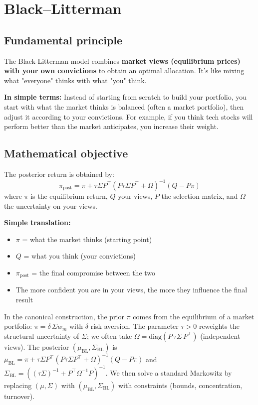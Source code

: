 \documentclass[11pt,a4paper]{article}
\begin{document}
\FloatBarrier
\section{Black--Litterman}

\subsection{Fundamental principle}
The Black-Litterman model combines \textbf{market views (equilibrium prices) with your own convictions} to obtain an optimal allocation. It's like mixing what "everyone" thinks with what "you" think.

\textbf{In simple terms:} Instead of starting from scratch to build your portfolio, you start with what the market thinks is balanced (often a market portfolio), then adjust it according to your convictions. For example, if you think tech stocks will perform better than the market anticipates, you increase their weight.

\subsection{Mathematical objective}
The posterior return is obtained by:
\[\pi_{\text{post}} = \pi + \tau \Sigma P^\top (P \tau \Sigma P^\top + \Omega)^{-1} (Q - P \pi)\]
where \(\pi\) is the equilibrium return, \(Q\) your views, \(P\) the selection matrix, and \(\Omega\) the uncertainty on your views.

\textbf{Simple translation:} 
\begin{itemize}
\item \(\pi\) = what the market thinks (starting point)
\item \(Q\) = what you think (your convictions)
\item \(\pi_{\text{post}}\) = the final compromise between the two
\item The more confident you are in your views, the more they influence the final result
\end{itemize}
\noindent In the canonical construction, the prior \(\pi\) comes from the equilibrium of a market portfolio: \(\pi = \delta \, \Sigma w_m\) with \(\delta\) risk aversion. The parameter \(\tau>0\) reweights the structural uncertainty of \(\Sigma\); we often take \(\Omega=\text{diag}(P\, \tau\Sigma\, P^\top)\) (independent views). The posterior \((\mu_{\text{BL}},\Sigma_{\text{BL}})\) is \(\mu_{\text{BL}}=\pi+ \tau \Sigma P^\top (P\tau\Sigma P^\top+\Omega)^{-1}(Q-P\pi)\) and \(\Sigma_{\text{BL}} = ( (\tau\Sigma)^{-1} + P^\top \Omega^{-1} P )^{-1}\). We then solve a standard Markowitz by replacing \((\mu,\Sigma)\) with \((\mu_{\text{BL}},\Sigma_{\text{BL}})\) with constraints (bounds, concentration, turnover).
\end{document}
